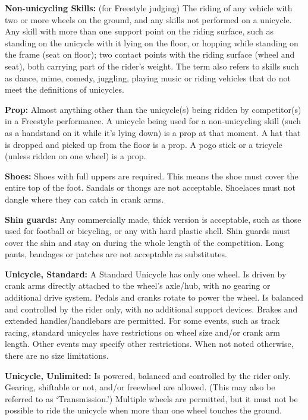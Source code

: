 \textbf{Non-unicycling Skills:} (for Freestyle judging) The riding of any vehicle with two or more wheels on the ground, and any skills not performed on a unicycle.
Any skill with more than one support point on the riding surface, such as standing on the unicycle with it lying on the floor, or hopping while standing on the frame (seat on floor); two contact points with the riding surface (wheel and seat), both carrying part of the rider's weight.
The term also refers to skills such as dance, mime, comedy, juggling, playing music or riding vehicles that do not meet the definitions of unicycles.

\textbf{Prop:} Almost anything other than the unicycle(s) being ridden by competitor(s) in a Freestyle performance.
A unicycle being used for a non-unicycling skill (such as a handstand on it while it's lying down) is a prop at that moment.
A hat that is dropped and picked up from the floor is a prop.
A pogo stick or a tricycle (unless ridden on one wheel) is a prop.

\textbf{Shoes:} Shoes with full uppers are required.
This means the shoe must cover the entire top of the foot.
Sandals or thongs are not acceptable.
Shoelaces must not dangle where they can catch in crank arms.

\textbf{Shin guards:} Any commercially made, thick version is acceptable, such as those used for football or bicycling, or any with hard plastic shell.
Shin guards must cover the shin and stay on during the whole length of the competition.
Long pants, bandages or patches are not acceptable as substitutes.

\textbf{Unicycle, Standard:} A Standard Unicycle has only one wheel.
Is driven by crank arms directly attached to the wheel's axle/hub, with no gearing or additional drive system.
Pedals and cranks rotate to power the wheel.
Is balanced and controlled by the rider only, with no additional support devices.
Brakes and extended handles/handlebars are permitted.
For some events, such as track racing, standard unicycles have restrictions on wheel size and/or crank arm length.
Other events may specify other restrictions.
When not noted otherwise, there are no size limitations.

\textbf{Unicycle, Unlimited:} Is powered, balanced and controlled by the rider only.
Gearing, shiftable or not, and/or freewheel are allowed.
(This may also be referred to as `Transmission.')
Multiple wheels are permitted, but it must not be possible to ride the unicycle when more than one wheel touches the ground.


